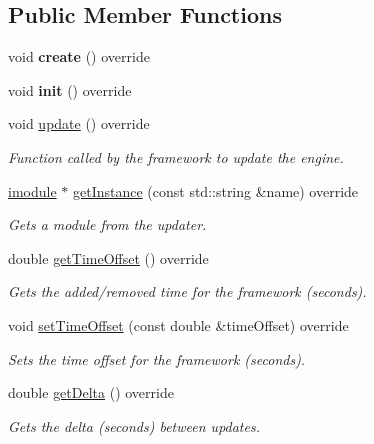 \subsection*{Public Member Functions}
\begin{DoxyCompactItemize}
\item 
\mbox{\label{classflounder_1_1glfwupdater_acd58077965d5ba137961c567d7d79aa9}} 
void {\bfseries create} () override
\item 
\mbox{\label{classflounder_1_1glfwupdater_ab0c8addaf2393f4c88969e71ed78f600}} 
void {\bfseries init} () override
\item 
void \hyperlink{classflounder_1_1glfwupdater_a2443d270f702e67ab44c7afb88c71a5e}{update} () override
\begin{DoxyCompactList}\small\item\em Function called by the framework to update the engine. \end{DoxyCompactList}\item 
\hyperlink{classflounder_1_1imodule}{imodule} $\ast$ \hyperlink{classflounder_1_1glfwupdater_a284945635b93ffc1bd6164ff20565349}{get\+Instance} (const std\+::string \&name) override
\begin{DoxyCompactList}\small\item\em Gets a module from the updater. \end{DoxyCompactList}\item 
double \hyperlink{classflounder_1_1glfwupdater_a6393f60d2b0f84a78ccf14b0c55ae1ee}{get\+Time\+Offset} () override
\begin{DoxyCompactList}\small\item\em Gets the added/removed time for the framework (seconds). \end{DoxyCompactList}\item 
void \hyperlink{classflounder_1_1glfwupdater_a7dc4371863e39a3a7870e4a2ac539fed}{set\+Time\+Offset} (const double \&time\+Offset) override
\begin{DoxyCompactList}\small\item\em Sets the time offset for the framework (seconds). \end{DoxyCompactList}\item 
double \hyperlink{classflounder_1_1glfwupdater_a8da4916f3335126413a072203b94a735}{get\+Delta} () override
\begin{DoxyCompactList}\small\item\em Gets the delta (seconds) between updates. \end{DoxyCompactList}\item 

\end{DoxyCompactItemize}
